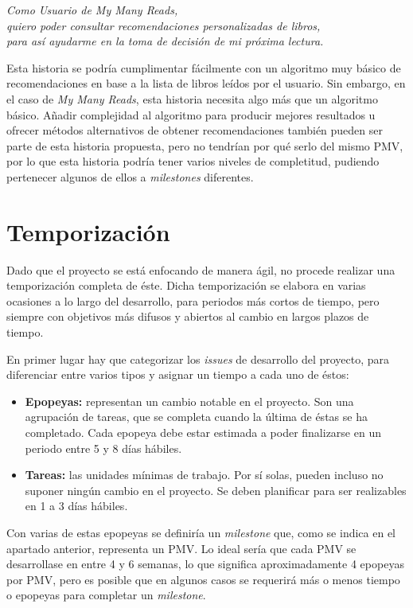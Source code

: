 \begin{center}
    \textit{Como Usuario de My Many Reads,}\\
    \textit{quiero poder consultar recomendaciones personalizadas de libros,}\\
    \textit{para así ayudarme en la toma de decisión de mi próxima lectura.}
\end{center}

Esta historia se podría cumplimentar fácilmente con un algoritmo muy básico de recomendaciones en base a la lista de libros leídos por el usuario. Sin embargo, en el caso de \textit{My Many Reads}, esta historia necesita algo más que un algoritmo básico. Añadir complejidad al algoritmo para producir mejores resultados u ofrecer métodos alternativos de obtener recomendaciones también pueden ser parte de esta historia propuesta, pero no tendrían por qué serlo del mismo PMV, por lo que esta historia podría tener varios niveles de completitud, pudiendo pertenecer algunos de ellos a \textit{milestones} diferentes.

\section{Temporización}

Dado que el proyecto se está enfocando de manera ágil, no procede realizar una temporización completa de éste. Dicha temporización se elabora en varias ocasiones a lo largo del desarrollo, para periodos más cortos de tiempo, pero siempre con objetivos más difusos y abiertos al cambio en largos plazos de tiempo.

En primer lugar hay que categorizar los \textit{issues} de desarrollo del proyecto, para diferenciar entre varios tipos y asignar un tiempo a cada uno de éstos:

\begin{itemize}
    \item \textbf{Epopeyas:} representan un cambio notable en el proyecto. Son una agrupación de tareas, que se completa cuando la última de éstas se ha completado. Cada epopeya debe estar estimada a poder finalizarse en un periodo entre 5 y 8 días hábiles.
    \item \textbf{Tareas:} las unidades mínimas de trabajo. Por sí solas, pueden incluso no suponer ningún cambio en el proyecto. Se deben planificar para ser realizables en 1 a 3 días hábiles.
\end{itemize}

Con varias de estas epopeyas se definiría un \textit{milestone} que, como se indica en el apartado anterior, representa un PMV. Lo ideal sería que cada PMV se desarrollase en entre 4 y 6 semanas, lo que significa aproximadamente 4 epopeyas por PMV, pero es posible que en algunos casos se requerirá más o menos tiempo o epopeyas para completar un \textit{milestone}.

